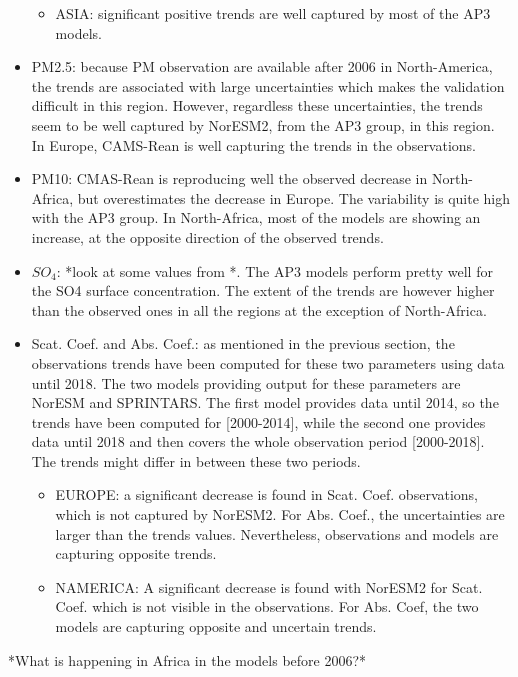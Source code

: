 \documentclass[journal abbreviation, manuscript]{copernicus}
\begin{document}
\begin{itemize}
\begin{itemize}
        \item ASIA: significant positive trends are well captured by most of the AP3 models.
       \end{itemize}
 \item PM2.5: because PM observation are available after 2006 in North-America, the trends are associated with large uncertainties which makes the validation difficult in this region. However, regardless these uncertainties, the trends seem to be well captured by NorESM2, from the AP3 group, in this region. In Europe, CAMS-Rean is well capturing the trends in the observations.
 \item PM10: CMAS-Rean is reproducing well the observed decrease in North-Africa, but overestimates the decrease in Europe. The variability is quite high with the AP3 group. In North-Africa, most of the models are showing an increase, at the opposite direction of the observed trends.
 \item $SO_{4}$: *look at some values from \cite{aas2019global}*. The AP3 models perform pretty well for the SO4 surface concentration. The extent of the trends are however higher than the observed ones in all the regions at the exception of North-Africa.
 \item Scat. Coef. and Abs. Coef.: as mentioned in the previous section, the observations trends have been computed for these two parameters using data until 2018. The two models providing output for these parameters are NorESM and SPRINTARS. The first model provides data until 2014, so the trends have been computed for [2000-2014], while the second one provides data until 2018 and then covers the whole observation period [2000-2018]. The trends might differ in between these two periods.
       \begin{itemize}
        \item EUROPE: a significant decrease is found in Scat. Coef. observations, which is not captured by NorESM2. For Abs. Coef., the uncertainties are larger than the trends values. Nevertheless, observations and models are capturing opposite trends.
        \item NAMERICA: A significant decrease is found with NorESM2 for Scat. Coef. which is not visible in the observations. For Abs. Coef, the two models are capturing opposite and uncertain trends.
       \end{itemize}
\end{itemize}

*What is happening in Africa in the models before 2006?*
\end{document}
